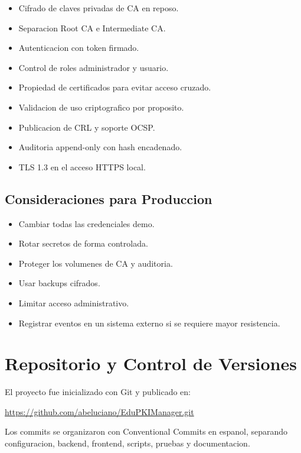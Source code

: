 \documentclass[12pt,a4paper]{article}
\begin{document}
\begin{itemize}[leftmargin=*]
    \item Cifrado de claves privadas de CA en reposo.
    \item Separacion Root CA e Intermediate CA.
    \item Autenticacion con token firmado.
    \item Control de roles administrador y usuario.
    \item Propiedad de certificados para evitar acceso cruzado.
    \item Validacion de uso criptografico por proposito.
    \item Publicacion de CRL y soporte OCSP.
    \item Auditoria append-only con hash encadenado.
    \item TLS 1.3 en el acceso HTTPS local.
\end{itemize}

\subsection{Consideraciones para Produccion}

\begin{itemize}[leftmargin=*]
    \item Cambiar todas las credenciales demo.
    \item Rotar secretos de forma controlada.
    \item Proteger los volumenes de CA y auditoria.
    \item Usar backups cifrados.
    \item Limitar acceso administrativo.
    \item Registrar eventos en un sistema externo si se requiere mayor resistencia.
\end{itemize}

\section{Repositorio y Control de Versiones}

El proyecto fue inicializado con Git y publicado en:

\begin{center}
\url{https://github.com/abeluciano/EduPKIManager.git}
\end{center}

Los commits se organizaron con Conventional Commits en espanol, separando configuracion, backend, frontend, scripts, pruebas y documentacion.
\end{document}

